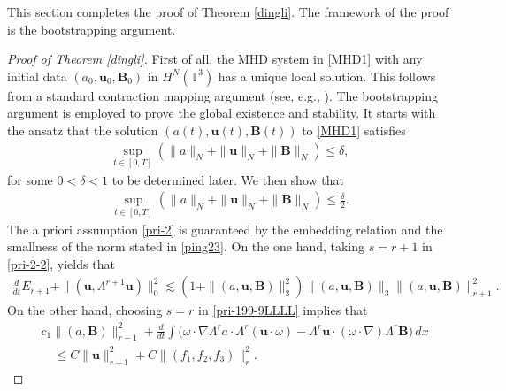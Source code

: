 \documentclass[12pt, reqno]{amsart}
\numberwithin{equation}{section}
\numberwithin{equation}{section}
\numberwithin{equation}{section}
\numberwithin{equation}{section}
\theoremstyle{remark}
\def\T{ \mathbb{T} }
\def\u{ \mathbf{u} }
\def\b{ \mathbf{B} }
\def\T{ \mathbb{T} }
\begin{document}
This section completes the proof of Theorem \ref{dingli}. The framework of the proof is the
bootstrapping argument.

\begin{proof}[Proof of Theorem \ref{dingli}]  First of all, the MHD system in \eqref{MHD1} with any
initial data $(a_0, \u_0,  \b_0)$ in $ H^N(\T^3)$ has a unique local solution.
This follows from a standard contraction mapping argument (see, e.g.,
\cite{MM}). The
bootstrapping argument is employed to prove the global existence and stability.
It starts with the ansatz that the solution $(a(t), \u(t),
\b(t))$ to \eqref{MHD1} satisfies
\begin{align}\label{ping23}
\sup_{t\in[0,T]}(\|a\|_{{N}}+\|\u\|_{{N}}+\|\b\|_{{N}})\le \delta,
\end{align}
for some $0<\delta<1$ to be determined later. We then show that
\begin{align*}%
\sup_{t\in[0,T]}(\|a\|_{{N}}+\|\u\|_{{N}}+\|\b\|_{{N}})\le \frac{\delta}{2}.
\end{align*}
The a priori assumption \eqref{pri-2} is guaranteed by the embedding relation and the smallness of the norm stated in \eqref{ping23}.
On the one hand, taking $s=r+1$ in \eqref{pri-2-2}, yields that
\begin{equation}\label{pri-2-2-22}
\begin{split}
\frac{d}{dt}E_{r+1}+\|(\u,\Lambda^{r+1}\u)\|_{0}^2
\lesssim(1+\|(a,\u,\b)\|^2_3)\|(a,\u,\b)\|_3\|(a,\u,\b)\|^2_{r+1}.
\end{split}\end{equation}
On the other hand,  choosing  $s=r$ in \eqref{pri-199-9LLLL} implies that
\begin{equation}
\begin{split}\label{pri-199-9LLLL-L}
&c_1\|(a,\b)\|_{r-1}^2+\frac{d}{dt}\int \Big(\omega\cdot\nabla\Lambda^{r}a\cdot\Lambda^{r}(\u\cdot\omega)-\Lambda^{r}\u\cdot(\omega\cdot\nabla)\Lambda^{r}\b\Big) \,dx\\&\quad\leq C\|\u\|_{r+1}^{2}+C\|(f_1,f_2,f_3)\|_{r}^{2}.
\end{split}
\end{equation}

\end{proof}
\end{document}

